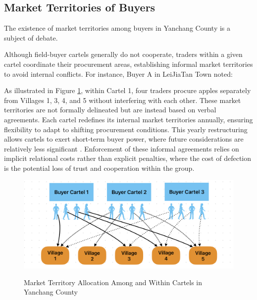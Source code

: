 \subsection{Market Territories of Buyers}
\noindent The existence of market territories among buyers in Yanchang County is a subject of debate.

Although field-buyer cartels generally do not cooperate, traders within a given cartel coordinate their procurement areas, establishing informal market territories to avoid internal conflicts. For instance, Buyer A in LeiJiaTan Town noted: 

\begin{quote}
\end{quote}

As illustrated in Figure \ref{fig: Market Territory}, within Cartel 1, four traders procure apples separately from Villages 1, 3, 4, and 5 without interfering with each other. These market territories are not formally delineated but are instead based on verbal agreements. Each cartel redefines its internal market territories annually, ensuring flexibility to adapt to shifting procurement conditions. This yearly restructuring allows cartels to exert short-term buyer power, where future considerations are relatively less significant \citep{sexton2013market}. Enforcement of these informal agreements relies on implicit relational costs rather than explicit penalties, where the cost of defection is the potential loss of trust and cooperation within the group.

\begin{figure}[hpt]
    \centering
        \caption{Market Territory Allocation Among and Within Cartels in Yanchang County}
    \includegraphics[width=\linewidth]{figures/Market_Territory.png}
    \label{fig: Market Territory}
\end{figure}

